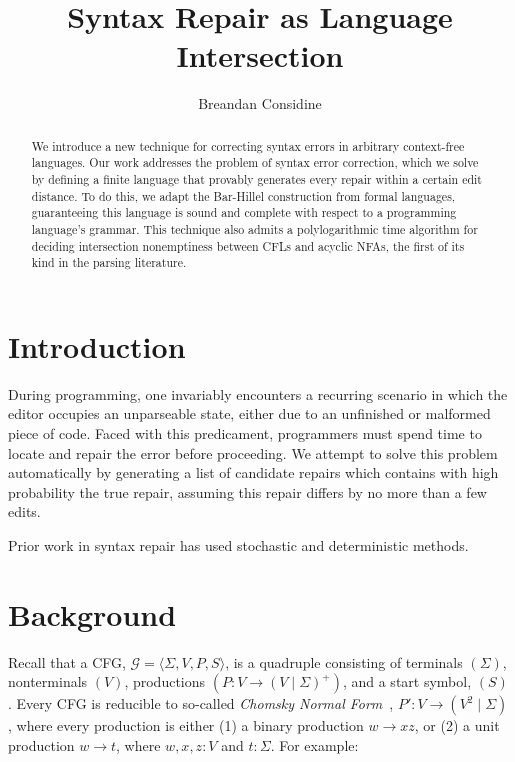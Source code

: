 \documentclass[sigplan,review,acmsmall,nonacm,screen,anonymous]{acmart}\settopmatter{printfolios=false,printccs=false,printacmref=false}
\begin{document}
%
\title{Syntax Repair as Language Intersection}
%
\begin{abstract}
We introduce a new technique for correcting syntax errors in arbitrary context-free languages. Our work addresses the problem of syntax error correction, which we solve by defining a finite language that provably generates every repair within a certain edit distance. To do this, we adapt the Bar-Hillel construction from formal languages, guaranteeing this language is sound and complete with respect to a programming language's grammar. This technique also admits a polylogarithmic time algorithm for deciding intersection nonemptiness between CFLs and acyclic NFAs, the first of its kind in the parsing literature.
\end{abstract}

\author{Breandan Considine}

\maketitle

\section{Introduction}

During programming, one invariably encounters a recurring scenario in which the editor occupies an unparseable state, either due to an unfinished or malformed piece of code. Faced with this predicament, programmers must spend time to locate and repair the error before proceeding. We attempt to solve this problem automatically by generating a list of candidate repairs which contains with high probability the true repair, assuming this repair differs by no more than a few edits.

Prior work in syntax repair has used stochastic and deterministic methods.

\clearpage

\section{Background}

Recall that a CFG, $\mathcal{G} = \langle \Sigma, V, P, S\rangle$, is a quadruple consisting of terminals $(\Sigma)$, nonterminals $(V)$, productions $(P\colon V \rightarrow (V \mid \Sigma)^+)$, and a start symbol, $(S)$. Every CFG is reducible to so-called \textit{Chomsky Normal Form}~\cite{chomsky1959certain}, $P'\colon V \rightarrow (V^2 \mid \Sigma)$, where every production is either (1) a binary production $w \rightarrow xz$, or (2) a unit production $w \rightarrow t$, where $w, x, z: V$ and $t: \Sigma$. For example:\vspace{-3pt}
\end{document}
